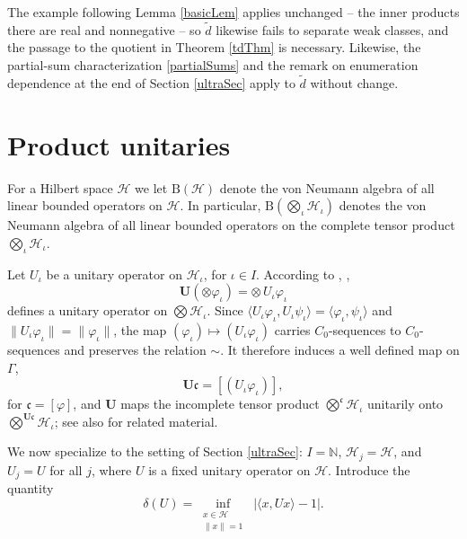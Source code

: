 \documentclass[twoside,11pt,letter]{article}
\def\bN{\mathbb{N}}
\def\cH{{\mathcal{H}}}
\def\fc{{\mathfrak{c}}}
\theoremstyle{definition}
\theoremstyle{definition}
\theoremstyle{plain}
\newenvironment{remark}[1][Remark.]{\begin{trivlist}
\item[\hskip \labelsep {\bfseries #1}]}{\end{trivlist}}
\begin{document}
\begin{remark}
The example following Lemma \ref{basicLem} applies unchanged -- the inner products there are real and nonnegative -- so $\tilde d$ likewise fails to separate weak classes, and the passage to the quotient in Theorem \ref{tdThm} is necessary. Likewise, the partial-sum characterization \eqref{partialSums} and the remark on enumeration dependence at the end of Section \ref{ultraSec} apply to $\tilde d$ without change.
\end{remark}

\section{\label{unitSec}Product unitaries}

For a Hilbert space $\cH$ we let $\mathrm{B}(\cH)$ denote the von Neumann algebra of all linear bounded operators on $\cH$. In particular, $\mathrm{B}(\bigotimes_\iota\cH_\iota)$ denotes the von Neumann algebra of all linear bounded operators on the complete tensor product $\bigotimes_\iota\cH_\iota$.

Let $U_\iota$ be a unitary operator on $\cH_\iota$, for $\iota\in I$. According to \cite{vN39}, \cite{N70},
\begin{equation}
\mathbf{U}(\otimes\varphi_\iota)=\otimes\, U_\iota\varphi_\iota
\end{equation}
defines a unitary operator on $\bigotimes\cH_\iota$. Since $\langle U_\iota\varphi_\iota,U_\iota\psi_\iota\rangle=\langle\varphi_\iota,\psi_\iota\rangle$ and $\|U_\iota\varphi_\iota\|=\|\varphi_\iota\|$, the map $(\varphi_\iota)\mapsto(U_\iota\varphi_\iota)$ carries $C_0$-sequences to $C_0$-sequences and preserves the relation $\sim$. It therefore induces a well defined map on $\Gamma$,
\begin{equation*}
\mathbf{U}\fc=[(U_\iota\varphi_\iota)],
\end{equation*}
for $\fc=[\varphi]$, and $\mathbf{U}$ maps the incomplete tensor product $\bigotimes^\fc\cH_\iota$ unitarily onto $\bigotimes^{\mathbf{U}\fc}\cH_\iota$; see also \cite{AN72} for related material.

We now specialize to the setting of Section \ref{ultraSec}: $I=\bN$, $\cH_j=\cH$, and $U_j=U$ for all $j$, where $U$ is a fixed unitary operator on $\cH$. Introduce the quantity
\begin{equation}\label{deltaDef}
\delta(U)=\inf_{\substack{x\in\cH\\ \|x\|=1}}\;\big|\langle x,Ux\rangle-1\big|.
\end{equation}
\end{document}

